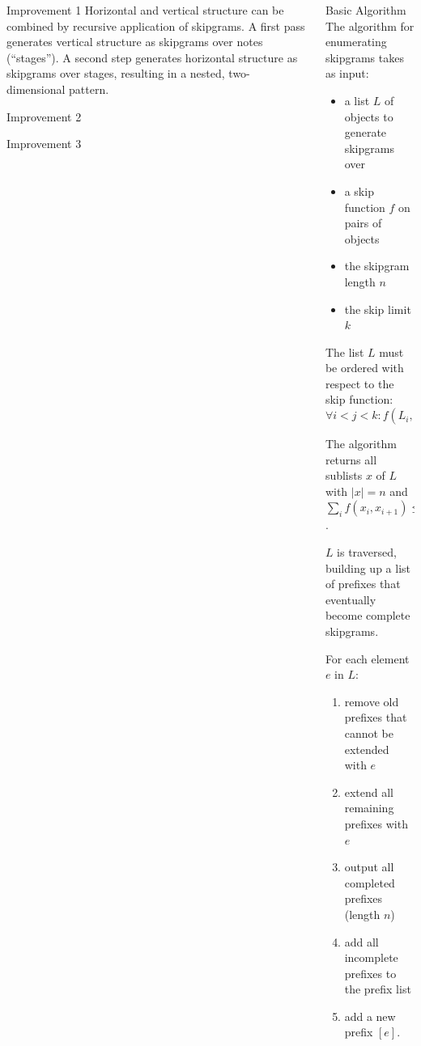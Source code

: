 \documentclass[final]{beamer}
\begin{document}
\begin{frame}[t]
\begin{columns}[t]
\begin{column}{0.3\textwidth}
\begin{block}{Improvement 1}
        Horizontal and vertical structure can be combined
        by \alert{recursive application of skipgrams}.
        A first pass generates vertical structure as skipgrams over notes (\enquote{stages}).
        A second step generates horizontal structure as skipgrams over stages,
        resulting in a nested, two-dimensional pattern.
      \end{block}

      \begin{block}{Improvement 2}
        \blindtext
      \end{block}

      \begin{block}{Improvement 3}
        \blindtext
      \end{block}
    \end{column}

    \begin{column}{0.3\textwidth}
      \begin{block}{Basic Algorithm}
        The algorithm for enumerating skipgrams takes as input:

        \begin{itemize}
        \item a list $L$ of objects to generate skipgrams over
        \item a skip function $f$ on pairs of objects
        \item the skipgram length $n$
        \item the skip limit $k$
        \end{itemize}

        The list $L$ must be ordered with respect to the skip function:
        \[\forall i < j < k: f(L_i,L_j) \leq f(L_i,L_z).\]

        The algorithm returns all sublists $x$ of $L$ with $|x| = n$ and
        $\sum_i f(x_i,x_{i+1}) \leq k$.

        $L$ is traversed, building up a \alert{list of prefixes}
        that eventually become complete skipgrams.

        For each element $e$ in $L$:
        \begin{enumerate}
        \item remove old prefixes that cannot be extended with $e$
        \item extend all remaining prefixes with $e$%
          \item output all completed prefixes (length $n$)
          \item add all incomplete prefixes to the prefix list
        \item add a new prefix $[e]$.
        \end{enumerate}


\end{block}
\end{column}
\end{columns}
\end{frame}
\end{document}
